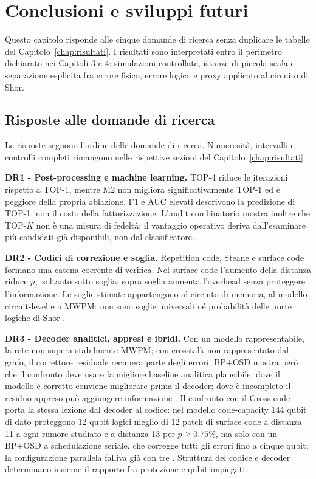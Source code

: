 \chapter{Conclusioni e sviluppi futuri}
\label{chap:conclusioni}
\label{chap:sviluppi}



Questo capitolo risponde alle cinque domande di ricerca senza duplicare le tabelle del Capitolo~\ref{chap:risultati}. I risultati sono interpretati entro il perimetro dichiarato nei Capitoli 3 e 4: simulazioni controllate, istanze di piccola scala e separazione esplicita fra errore fisico, errore logico e proxy applicato al circuito di Shor.

\section{Risposte alle domande di ricerca}\label{sec:finale_6_1}

Le risposte seguono l'ordine delle domande di ricerca. Numerosità, intervalli e controlli completi rimangono nelle rispettive sezioni del Capitolo~\ref{chap:risultati}.

\label{sec:finale_6_1_1}
\textbf{DR1 - Post-processing e machine learning.}
TOP-4 riduce le iterazioni rispetto a TOP-1, mentre M2 non migliora significativamente TOP-1 ed è peggiore della propria ablazione. F1 e AUC elevati descrivono la predizione di TOP-1, non il costo della fattorizzazione. L'audit combinatorio mostra inoltre che TOP-$K$ non è una misura di fedeltà: il vantaggio operativo deriva dall'esaminare più candidati già disponibili, non dal classificatore.

\label{sec:finale_6_1_2}
\textbf{DR2 - Codici di correzione e soglia.}
Repetition code, Steane e surface code formano una catena coerente di verifica. Nel surface code l'aumento della distanza riduce $p_L$ soltanto sotto soglia; sopra soglia aumenta l'overhead senza proteggere l'informazione. Le soglie stimate appartengono al circuito di memoria, al modello circuit-level e a MWPM: non sono soglie universali né probabilità delle porte logiche di Shor \cite{steane1996,fowler2012,googleQECBelowThreshold2025,dennis2002topological}.

\label{sec:finale_6_1_3}
\textbf{DR3 - Decoder analitici, appresi e ibridi.}
Con un modello rappresentabile, la rete non supera stabilmente MWPM; con crosstalk non rappresentato dal grafo, il correttore residuale recupera parte degli errori. BP+OSD mostra però che il confronto deve usare la migliore baseline analitica plausibile: dove il modello è corretto conviene migliorare prima il decoder; dove è incompleto il residuo appreso può aggiungere informazione \cite{roffe2020,panteleev2021,alphaqubit2024}. Il confronto con il Gross code porta la stessa lezione dal decoder al codice: nel modello code-capacity 144 qubit di dato proteggono 12 qubit logici meglio di 12 patch di surface code a distanza 11 a ogni rumore studiato e a distanza 13 per $p \ge 0.75\%$, ma solo con un BP+OSD a schedulazione seriale, che corregge tutti gli errori fino a cinque qubit; la configurazione parallela falliva già con tre \cite{bravyi2024}. Struttura del codice e decoder determinano insieme il rapporto fra protezione e qubit impiegati.

